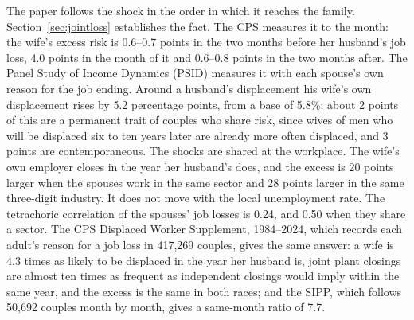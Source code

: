 The paper follows the shock in the order in which it reaches the family. Section~\ref{sec:jointloss} establishes the
fact. The CPS measures it to the month: the wife's excess risk is 0.6--0.7 points in the two months before her
husband's job loss, 4.0 points in the month of it and 0.6--0.8 points in the two months after. The Panel Study of
Income Dynamics (PSID) measures it with each spouse's own reason for the job ending. Around a husband's displacement
his wife's own displacement rises by 5.2 percentage points, from a base of 5.8\%; about 2 points of this are a
permanent trait of couples who share risk, since wives of men who will be displaced six to ten years later are already
more often displaced, and 3 points are contemporaneous. The shocks are shared at the workplace. The wife's own employer
closes in the year her husband's does, and the excess is 20 points larger when the spouses work in the same sector and
28 points larger in the same three-digit industry. It does not move with the local unemployment rate. The tetrachoric
correlation of the spouses' job losses is 0.24, and 0.50 when they share a sector. The CPS Displaced Worker
Supplement, 1984--2024, which records each adult's reason for a job loss in 417,269 couples, gives the same answer: a
wife is 4.3 times as likely to be displaced in the year her husband is, joint plant closings are almost ten times as
frequent as independent closings would imply within the same year, and the excess is the same in both races; and the
SIPP, which follows 50,692 couples month by month, gives a same-month ratio of 7.7.

